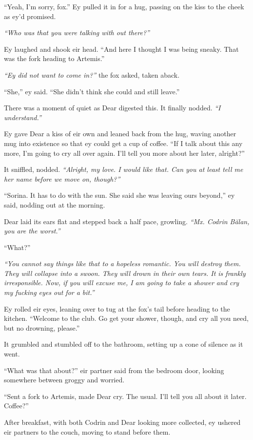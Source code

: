``Yeah, I'm sorry, fox.'' Ey pulled it in for a hug, passing on the kiss to the cheek as ey'd promised.

\emph{``Who was that you were talking with out there?''}

Ey laughed and shook eir head. ``And here I thought I was being sneaky. That was the fork heading to Artemis.''

\emph{``Ey did not want to come in?''} the fox asked, taken aback.

``She,'' ey said. ``She didn't think she could and still leave.''

There was a moment of quiet as Dear digested this. It finally nodded. \emph{``I understand.''}

Ey gave Dear a kiss of eir own and leaned back from the hug, waving another mug into existence so that ey could get a cup of coffee. ``If I talk about this any more, I'm going to cry all over again. I'll tell you more about her later, alright?''

It sniffled, nodded. \emph{``Alright, my love. I would like that. Can you at least tell me her name before we move on, though?''}

``Sorina. It has to do with the sun. She said she was leaving ours beyond,'' ey said, nodding out at the morning.

Dear laid its ears flat and stepped back a half pace, growling. \emph{``Mx. Codrin Bălan, you are the worst.''}

``What?''

\emph{``You cannot say things like that to a hopeless romantic. You will destroy them. They will collapse into a swoon. They will drown in their own tears. It is frankly irresponsible. Now, if you will excuse me, I am going to take a shower and cry my fucking eyes out for a bit.''}

Ey rolled eir eyes, leaning over to tug at the fox's tail before heading to the kitchen. ``Welcome to the club. Go get your shower, though, and cry all you need, but no drowning, please.''

It grumbled and stumbled off to the bathroom, setting up a cone of silence as it went.

``What was that about?'' eir partner said from the bedroom door, looking somewhere between groggy and worried.

``Sent a fork to Artemis, made Dear cry. The usual. I'll tell you all about it later. Coffee?''

After breakfast, with both Codrin and Dear looking more collected, ey ushered eir partners to the couch, moving to stand before them.


